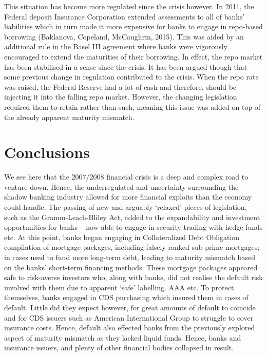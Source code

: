 \documentclass[11pt, english]{article}
\begin{document}
	This situation has become more regulated since the crisis however. In 2011, the Federal deposit Insurance Corporation extended assessments to all of banks’ liabilities which in turn made it more expensive for banks to engage in repo-based borrowing (Baklanova, Copeland, McCaughrin, 2015). This was aided by an additional rule in the Basel III agreement where banks were vigorously encouraged to extend the maturities of their borrowing. In effect, the repo market has been stabilised in a sense since the crisis. It has been argued though that some previous change in regulation contributed to the crisis. When the repo rate was raised, the Federal Reserve had a lot of cash and therefore, should be injecting it into the falling repo market. However, the changing legislation required them to retain rather than such, meaning this issue was added on top of the already apparent maturity mismatch.\\

\newpage

\section{Conclusions}

	We see here that the 2007/2008 financial crisis is a deep and complex road to venture down. Hence, the underregulated and uncertainty surrounding the shadow banking industry allowed for more financial exploits than the economy could handle. The passing of new and arguably ‘relaxed’ pieces of legislation, such as the Gramm-Leach-Bliley Act, added to the expandability and investment opportunities for banks – now able to engage in security trading with hedge funds etc. At this point, banks began engaging in Collateralized Debt Obligation compilation of mortgage packages, including falsely ranked sub-prime mortgages; in cases used to fund more long-term debt, leading to maturity mismatch based on the banks’ short-term financing methods. These mortgage packages appeared safe to risk-averse investors who, along with banks, did not realise the default risk involved with them due to apparent `safe' labelling. AAA etc. To protect themselves, banks engaged in CDS purchasing which insured them in cases of default. Little did they expect however, for great amounts of default to coincide and for CDS issuers such as American International Group to struggle to cover insurance costs. Hence, default also effected banks from the previously explored aspect of maturity mismatch as they lacked liquid funds. Hence, banks and insurance issuers, and plenty of other financial bodies collapsed in result.\\
\end{document}
